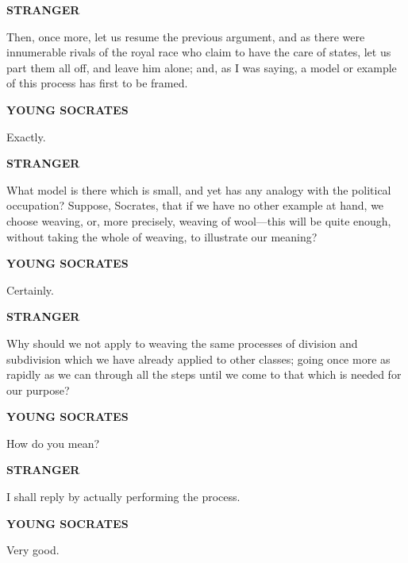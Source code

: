 \documentclass[11pt,letter]{article}
\begin{document}
\par \textbf{STRANGER}
\par   Then, once more, let us resume the previous argument, and as there were innumerable rivals of the royal race who claim to have the care of states, let us part them all off, and leave him alone; and, as I was saying, a model or example of this process has first to be framed.

\par \textbf{YOUNG SOCRATES}
\par   Exactly.

\par \textbf{STRANGER}
\par   What model is there which is small, and yet has any analogy with the political occupation? Suppose, Socrates, that if we have no other example at hand, we choose weaving, or, more precisely, weaving of wool—this will be quite enough, without taking the whole of weaving, to illustrate our meaning?

\par \textbf{YOUNG SOCRATES}
\par   Certainly.

\par \textbf{STRANGER}
\par   Why should we not apply to weaving the same processes of division and subdivision which we have already applied to other classes; going once more as rapidly as we can through all the steps until we come to that which is needed for our purpose?

\par \textbf{YOUNG SOCRATES}
\par   How do you mean?

\par \textbf{STRANGER}
\par   I shall reply by actually performing the process.

\par \textbf{YOUNG SOCRATES}
\par   Very good.
\end{document}
